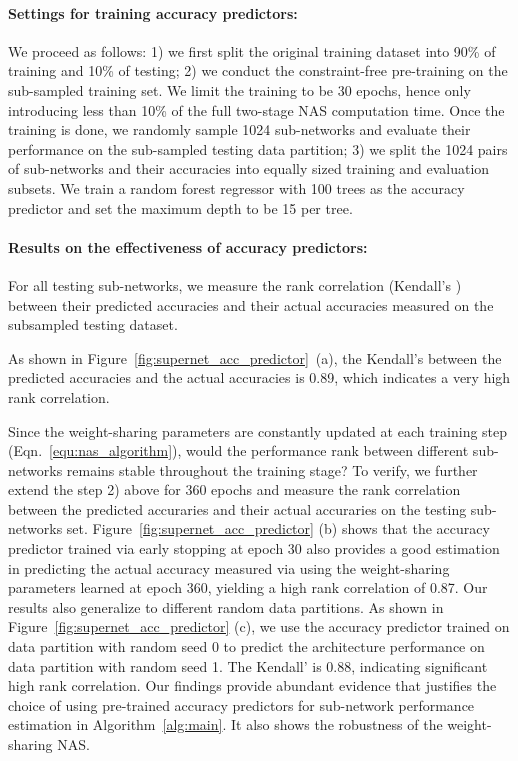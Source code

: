 \documentclass[final]{cvpr}
\theoremstyle{definition}
\begin{document}
\paragraph{Settings for training accuracy predictors:} 
We proceed as follows: 
1) we first split the original training dataset
into 90\% of training and 10\% of testing; 
2) we conduct the constraint-free pre-training on the sub-sampled training set.
We limit the training to be 30 epochs, 
hence only introducing less than 10\% of the full two-stage NAS computation time.
Once the training is done, we randomly sample 
1024 sub-networks and evaluate their performance on the sub-sampled testing data partition; 
3) we split the 1024 pairs of sub-networks and their accuracies into equally sized training and evaluation subsets. 
We train a random forest regressor with 100 trees as the accuracy predictor and set the maximum depth to be 15 per tree. 



\paragraph{Results on the effectiveness of accuracy predictors:}
For all testing sub-networks, 
we measure the rank correlation (Kendall's ) 
between their predicted accuracies 
and their actual accuracies measured on the subsampled testing dataset. 

As shown in Figure~\ref{fig:supernet_acc_predictor}~(a), 
the Kendall's  between the predicted accuracies and the actual accuracies is 0.89, which indicates a very high rank correlation.

Since the weight-sharing parameters are constantly updated at each training step (Eqn.~\eqref{equ:nas_algorithm}), would the performance rank between different sub-networks remains stable throughout the training stage? 
To verify,  we further extend the step 2) above for 360 epochs and measure the 
rank correlation between the predicted accuraries and their actual accuraries on the testing sub-networks set. 
Figure~\ref{fig:supernet_acc_predictor} (b) shows 
that the accuracy predictor trained via early stopping at epoch 30
also provides a good estimation in predicting the actual accuracy measured via using the weight-sharing parameters learned at epoch 360, yielding a high rank correlation of 0.87.  
Our results also generalize to different random data partitions.
As shown in Figure~\ref{fig:supernet_acc_predictor} (c), 
we use the accuracy predictor trained on data partition with random seed 0 to predict the architecture performance on data partition with random seed 1.
The Kendall'  is 0.88, indicating significant high rank correlation. 
Our findings provide abundant evidence that justifies the choice of using pre-trained accuracy predictors for sub-network performance estimation in Algorithm~\ref{alg:main}. It also shows the robustness of the weight-sharing NAS.
 
\end{document}
